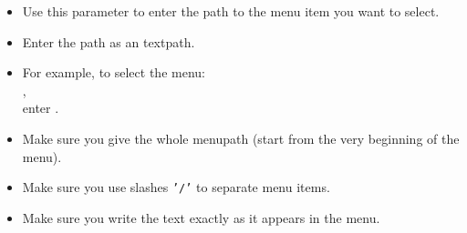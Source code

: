    \begin{itemize}
\item Use this parameter to enter the path to the menu item you want to select.
\item Enter the path as an textpath.
\item For example, to select the menu:\\ ,\\ enter .
\item Make sure you give the whole menupath (start from the very beginning of the menu).
\item Make sure you use slashes {\tt '/'} to separate menu items.
\item Make sure you write the text exactly as it appears in the menu.
 
\end{itemize}